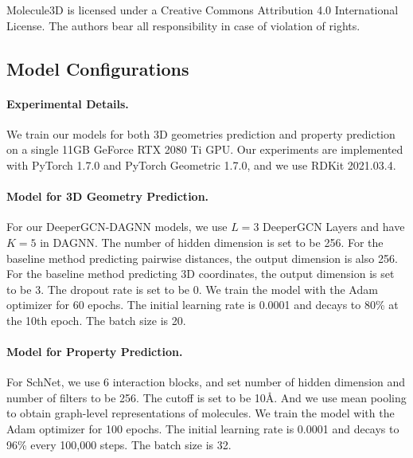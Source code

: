 \documentclass{article}
\begin{document}
Molecule3D is licensed under a Creative Commons Attribution 4.0 International License. The authors bear all responsibility in case of violation of rights.


\subsection{Model Configurations}
\paragraph{Experimental Details.} We train our models for both 3D geometries prediction and property prediction on a single 11GB GeForce RTX 2080 Ti GPU. Our experiments are implemented with PyTorch 1.7.0 and PyTorch Geometric 1.7.0, and we use RDKit 2021.03.4. 

\paragraph{Model for 3D Geometry Prediction.} For our DeeperGCN-DAGNN models, we use $L=3$ DeeperGCN Layers and have $K=5$ in DAGNN. The number of hidden dimension is set to be 256. For the baseline method predicting pairwise distances, the output dimension is also 256. For the baseline method predicting 3D coordinates, the output dimension is set to be 3. The dropout rate is set to be 0. We train the model with the Adam optimizer \cite{kingma2015adam} for 60 epochs. The initial learning rate is 0.0001 and decays to 80\% at the 10th epoch. The batch size is 20. 

\paragraph{Model for Property Prediction.} For SchNet, we use 6 interaction blocks, and set number of hidden dimension and number of filters to be 256. The cutoff is set to be 10\AA. And we use mean pooling to obtain graph-level representations of molecules. We train the model with the Adam optimizer for 100 epochs. The initial learning rate is 0.0001 and decays to 96\% every 100,000 steps. The batch size is 32. 
\end{document}
